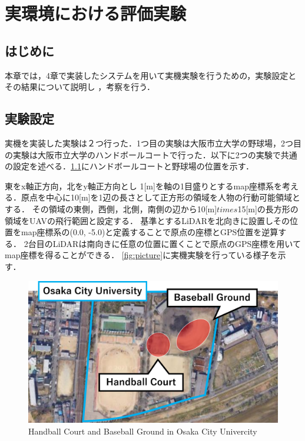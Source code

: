 \documentclass[autodetect-engine,dvipdfmx-if-dvi,ja=standard,a4j,jbase=11pt,magstyle=nomag*]{bxjsreport}
\begin{document}
\chapter[実環境における評価実験]{実環境における評価実験}
\label{chap:sim_nao}


\section{はじめに}
本章では，4章で実装したシステムを用いて実機実験を行うための，実験設定とその結果について説明し
，考察を行う．



\section{実験設定}
実機を実装した実験は２つ行った．1つ目の実験は大阪市立大学の野球場，2つ目の実験は大阪市立大学のハンドボールコートで行った．以下に2つの実験で共通の設定を述べる．\cref{fig:ground}にハンドボールコートと野球場の位置を示す．

東をx軸正方向，北をy軸正方向とし
1[m]を軸の1目盛りとするmap座標系を考える．原点を中心に10[m]を1辺の長さとして正方形の領域を人物の行動可能領域とする．
その領域の東側，西側，北側，南側の辺から10[m]$times$15[m]の長方形の領域をUAVの飛行範囲と設定する．
基準とするLiDARを北向きに設置しその位置をmap座標系の(0.0, -5.0)と定義することで原点の座標とGPS位置を逆算する．
2台目のLiDARは南向きに任意の位置に置くことで原点のGPS座標を用いてmap座標を得ることができる．
\cref{fig:picture}に実機実験を行っている様子を示す．

\begin{figure}[h]
    \centering
    \includegraphics[width=0.8\linewidth, clip]{./figure/chapter5/ground.png}
    \caption{Handball Court and Baseball Ground in Osaka City Univercity}
    \label{fig:ground}
\end{figure}
\end{document}
